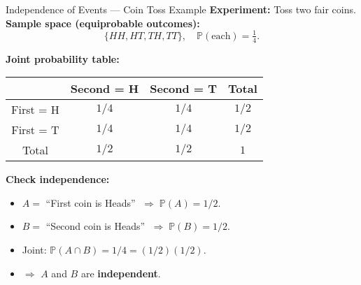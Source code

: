 \documentclass{beamer}
\newcommand{\1}{\mathbf{1}}
\begin{document}
\begin{frame}{Independence of Events — Coin Toss Example}
  \small
  \textbf{Experiment:} Toss two fair coins. \\[0.5em]

  \textbf{Sample space (equiprobable outcomes):}
  \[
    \{ HH, HT, TH, TT \}, \quad \mathbb{P}(\text{each}) = \tfrac{1}{4}.
  \]

  \medskip
  \textbf{Joint probability table:}

  \begin{center}
    \begin{tabular}{c|c|c|c}
      & Second = H & Second = T & Total \\
      \hline
      First = H & $1/4$ & $1/4$ & $1/2$ \\
      \hline
      First = T & $1/4$ & $1/4$ & $1/2$ \\
      \hline
      Total & $1/2$ & $1/2$ & $1$
    \end{tabular}
  \end{center}

  \medskip
  \textbf{Check independence:}
  \begin{itemize}
    \item $A =$ “First coin is Heads” $\;\Rightarrow\; \mathbb{P}(A)=1/2$.
    \item $B =$ “Second coin is Heads” $\;\Rightarrow\; \mathbb{P}(B)=1/2$.
    \item Joint: $\mathbb{P}(A \cap B) = 1/4 = (1/2)(1/2)$.
    \item $\Rightarrow$ $A$ and $B$ are \textbf{independent}.
  \end{itemize}
\end{frame}
\end{document}
